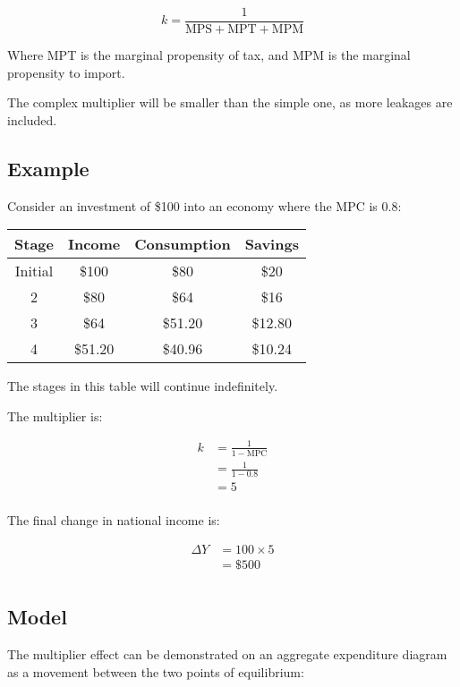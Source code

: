 \documentclass[a4paper,11pt]{article}
\begin{document}
$$
k = \frac{1}{\mbox{MPS} + \mbox{MPT} + \mbox{MPM}}
$$

Where MPT is the marginal propensity of tax, and MPM is the marginal propensity
to import.

The complex multiplier will be smaller than the simple one, as more leakages
are included.


\subsection{Example}

Consider an investment of \$100 into an economy where the MPC is 0.8:

\begin{center}
\begin{tabular}{c|c c c}
Stage & Income & Consumption & Savings \\
\hline
Initial & \$100   & \$80    & \$20    \\
2       & \$80    & \$64    & \$16    \\
3       & \$64    & \$51.20 & \$12.80 \\
4       & \$51.20 & \$40.96 & \$10.24 \\
\end{tabular}
\end{center}

The stages in this table will continue indefinitely.

The multiplier is:

$$
\begin{aligned}
k & = \frac{1}{1 - \mbox{MPC}} \\
& = \frac{1}{1 - 0.8} \\
& = 5 \\
\end{aligned}
$$

The final change in national income is:

$$
\begin{aligned}
\Delta Y & = 100 \times 5 \\
& = \$500 \\
\end{aligned}
$$


\subsection{Model}

The multiplier effect can be demonstrated on an aggregate expenditure diagram
as a movement between the two points of equilibrium:
\end{document}
